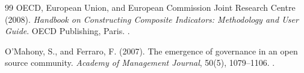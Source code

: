 \begin{thebibliography}{99}
OECD, European Union, and European Commission Joint Research Centre (2008).
\emph{Handbook on Constructing Composite Indicators: Methodology and User Guide}.
OECD Publishing, Paris.
.

O'Mahony, S., and Ferraro, F. (2007).
The emergence of governance in an open source community.
\emph{Academy of Management Journal}, 50(5), 1079--1106.
.

\end{thebibliography}
\clearpage
\begingroup
\renewcommand{\bibsection}{\section*{References\enspace{\normalfont\sffamily\fontsize{11}{14}\selectfont continued}}}
